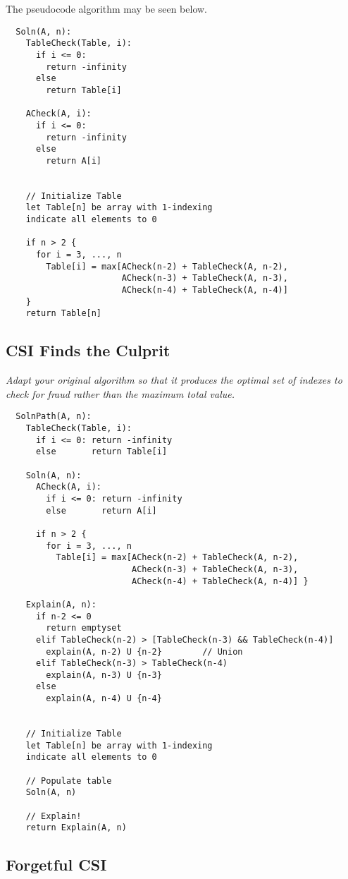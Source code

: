 \documentclass[11pt, oneside]{article}   	%
\theoremstyle{definition}
\theoremstyle{remark}
\begin{document}
The pseudocode algorithm may be seen below.
\cleardoublepage
\begin{verbatim}
  Soln(A, n):
    TableCheck(Table, i):
      if i <= 0:
        return -infinity
      else
        return Table[i]
    
    ACheck(A, i):
      if i <= 0:
        return -infinity
      else
        return A[i]
    
    
    // Initialize Table
    let Table[n] be array with 1-indexing
    indicate all elements to 0
    
    if n > 2 {
      for i = 3, ..., n
        Table[i] = max[ACheck(n-2) + TableCheck(A, n-2),
                       ACheck(n-3) + TableCheck(A, n-3),
                       ACheck(n-4) + TableCheck(A, n-4)]
    }
    return Table[n]
\end{verbatim}


\clearpage
\subsection{CSI Finds the Culprit}
\label{sec-2-1}
\textit{Adapt your original algorithm so that it produces the optimal set of indexes to check for fraud rather than the maximum total value.}
\begin{verbatim}
  SolnPath(A, n):
    TableCheck(Table, i):
      if i <= 0: return -infinity
      else       return Table[i]
            
    Soln(A, n):  
      ACheck(A, i):
        if i <= 0: return -infinity
        else       return A[i]

      if n > 2 {
        for i = 3, ..., n
          Table[i] = max[ACheck(n-2) + TableCheck(A, n-2),
                         ACheck(n-3) + TableCheck(A, n-3),
                         ACheck(n-4) + TableCheck(A, n-4)] }
    
    Explain(A, n):
      if n-2 <= 0
        return emptyset
      elif TableCheck(n-2) > [TableCheck(n-3) && TableCheck(n-4)]
        explain(A, n-2) U {n-2}        // Union
      elif TableCheck(n-3) > TableCheck(n-4)
        explain(A, n-3) U {n-3}
      else
        explain(A, n-4) U {n-4}

    
    // Initialize Table
    let Table[n] be array with 1-indexing
    indicate all elements to 0
    
    // Populate table
    Soln(A, n)
    
    // Explain!
    return Explain(A, n)
\end{verbatim}

\subsection{Forgetful CSI}
\label{sec-2-2}
\end{document}
